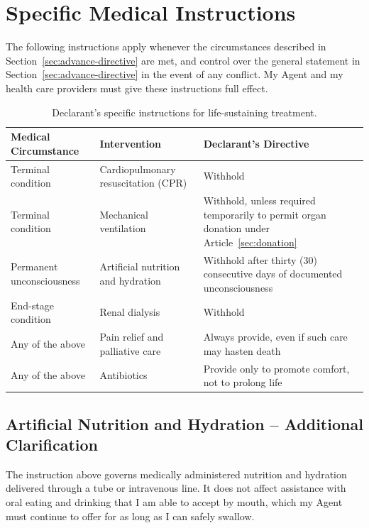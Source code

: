 \section{Specific Medical Instructions}
\label{sec:medical-instructions}

The following instructions apply whenever the circumstances described in Section~\ref{sec:advance-directive} are met, and control over the general statement in Section~\ref{sec:advance-directive} in the event of any conflict. My Agent and my health care providers must give these instructions full effect.

\begin{table}[H]
\centering
\small
\renewcommand{\arraystretch}{1.35}
\begin{tabularx}{\linewidth}{@{}p{3.5cm}p{3.6cm}X@{}}
\toprule
\textbf{Medical Circumstance} & \textbf{Intervention} & \textbf{Declarant's Directive} \\
\midrule
\rowcolor{willtint!60}
Terminal condition & Cardiopulmonary resuscitation (CPR) & Withhold \\
Terminal condition & Mechanical ventilation & Withhold, unless required temporarily to permit organ donation under Article~\ref{sec:donation} \\
\rowcolor{willtint!60}
Permanent unconsciousness & Artificial nutrition and hydration & Withhold after thirty (30) consecutive days of documented unconsciousness \\
End-stage condition & Renal dialysis & Withhold \\
\rowcolor{willtint!60}
Any of the above & Pain relief and palliative care & Always provide, even if such care may hasten death \\
Any of the above & Antibiotics & Provide only to promote comfort, not to prolong life \\
\bottomrule
\end{tabularx}
\caption{Declarant's specific instructions for life-sustaining treatment.}
\label{tab:medical-instructions}
\end{table}

\subsection{Artificial Nutrition and Hydration -- Additional Clarification}
The instruction above governs medically administered nutrition and hydration delivered through a tube or intravenous line. It does not affect assistance with oral eating and drinking that I am able to accept by mouth, which my Agent must continue to offer for as long as I can safely swallow.

